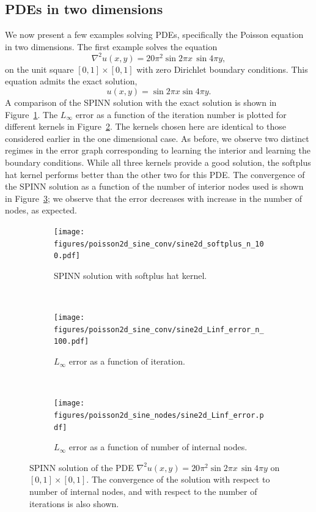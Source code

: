 \documentclass[12pt]{article}
\begin{document}
\subsection{PDEs in two dimensions}
We now present a few examples solving PDEs, specifically the Poisson equation in two dimensions. The first example solves the equation
\begin{displaymath}
\nabla^2 u(x, y) = 20\pi^2 \sin 2\pi x \, \sin 4 \pi y,
\end{displaymath}
on the unit square $[0,1]\times[0,1]$ with zero Dirichlet boundary conditions. This equation admits the exact solution,
\begin{displaymath}
u(x,y) = \sin 2\pi x \sin 4 \pi y.
\end{displaymath}
A comparison of the SPINN solution with the exact solution is shown in Figure~\ref{fig:2d_A_softplus_n_100}. The $L_{\infty}$ error as a function of the iteration number is plotted for different kernels in Figure~\ref{fig:2d_A_Linf_n_100}. The kernels chosen here are identical to those considered earlier in the one dimensional case. As before, we observe two distinct regimes in the error graph corresponding to learning the interior and learning the boundary conditions. While all three kernels provide a good solution, the softplus hat kernel performs better than the other two for this PDE. The convergence of the SPINN solution as a function of the number of interior nodes used is shown in Figure~\ref{fig:2d_A_Linf}; we observe that the error decreases with increase in the number of nodes, as expected.

\begin{figure}
\begin{subfigure}{0.32\textwidth}
\centering
\texttt{[image: figures/poisson2d\_sine\_conv/sine2d\_softplus\_n\_100.pdf]}
\caption{SPINN solution with softplus hat kernel.}
\label{fig:2d_A_softplus_n_100}
\end{subfigure}
~
\begin{subfigure}{0.32\textwidth}
\centering
\texttt{[image: figures/poisson2d\_sine\_conv/sine2d\_Linf\_error\_n\_100.pdf]}
\caption{$L_{\infty}$ error as a function of iteration.}
\label{fig:2d_A_Linf_n_100}
\end{subfigure}
~
\begin{subfigure}{0.32\textwidth}
\centering
\texttt{[image: figures/poisson2d\_sine\_nodes/sine2d\_Linf\_error.pdf]}
\caption{$L_{\infty}$ error as a function of number of internal nodes.}
\label{fig:2d_A_Linf}
\end{subfigure}
\caption{SPINN solution of the PDE $\nabla^2 u(x, y) = 20\pi^2 \sin 2\pi x \, \sin 4 \pi y$ on $[0,1]\times[0,1]$. The convergence of the solution with respect to number of internal nodes, and with respect to the number of iterations is also shown.}
\label{fig:spinn_pde2d_sine}
\end{figure}
\end{document}
